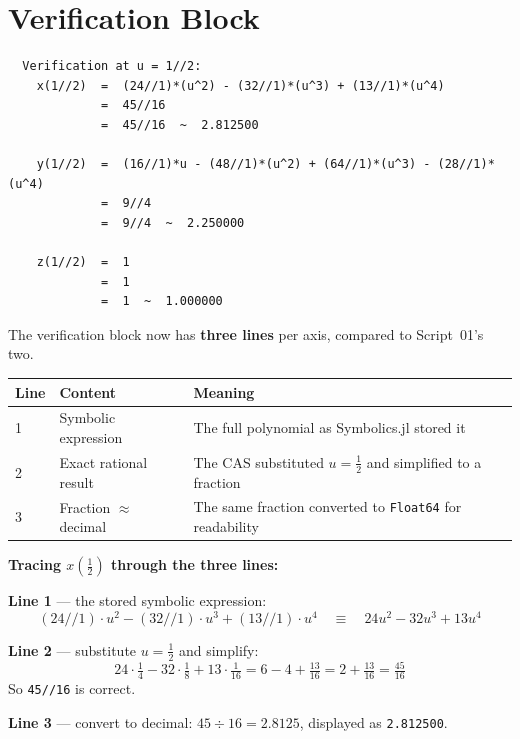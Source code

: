 \documentclass[12pt, a4paper]{article}
\newcommand{\cd}[1]{\texttt{#1}}
\begin{document}
\section{Verification Block}

\begin{verbatim}
  Verification at u = 1//2:
    x(1//2)  =  (24//1)*(u^2) - (32//1)*(u^3) + (13//1)*(u^4)
             =  45//16
             =  45//16  ~  2.812500

    y(1//2)  =  (16//1)*u - (48//1)*(u^2) + (64//1)*(u^3) - (28//1)*(u^4)
             =  9//4
             =  9//4  ~  2.250000

    z(1//2)  =  1
             =  1
             =  1  ~  1.000000
\end{verbatim}

The verification block now has \textbf{three lines} per axis,
compared to Script~01's two.

\begin{center}
\begin{tabular}{lp{4cm}p{5cm}}
\toprule
Line & Content & Meaning \\
\midrule
1 & Symbolic expression &
  The full polynomial as Symbolics.jl stored it \\[4pt]
2 & Exact rational result &
  The CAS substituted $u = \tfrac{1}{2}$ and simplified to a fraction \\[4pt]
3 & Fraction $\approx$ decimal &
  The same fraction converted to \cd{Float64} for readability \\
\bottomrule
\end{tabular}
\end{center}

\begin{examplebox}
\textbf{Tracing $x\!\left(\tfrac{1}{2}\right)$ through the three lines:}

\medskip
\textbf{Line 1} --- the stored symbolic expression:
\[
  (24/\!/1)\cdot u^2 - (32/\!/1)\cdot u^3 + (13/\!/1)\cdot u^4
  \quad\equiv\quad 24u^2 - 32u^3 + 13u^4
\]

\textbf{Line 2} --- substitute $u = \tfrac{1}{2}$ and simplify:
\[
  24 \cdot \tfrac{1}{4} - 32 \cdot \tfrac{1}{8} + 13 \cdot \tfrac{1}{16}
  = 6 - 4 + \tfrac{13}{16}
  = 2 + \tfrac{13}{16}
  = \tfrac{45}{16}
\]
So \cd{45//16} is correct. \checkmark

\textbf{Line 3} --- convert to decimal:
$45 \div 16 = 2.8125$, displayed as \cd{2.812500}. \checkmark
\end{examplebox}
\end{document}
